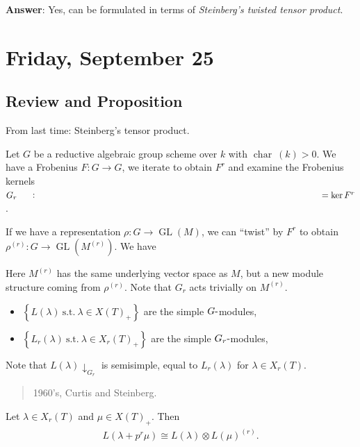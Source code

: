 \textbf{Answer}: Yes, can be formulated in terms of \emph{Steinberg's
twisted tensor product}.

\hypertarget{friday-september-25}{%
\section{Friday, September 25}\label{friday-september-25}}

\hypertarget{review-and-proposition}{%
\subsection{Review and Proposition}\label{review-and-proposition}}

From last time: Steinberg's tensor product.

Let \(G\) be a reductive algebraic group scheme over \(k\) with
\(\operatorname{char}~(k) > 0\). We have a Frobenius \(F:G\to G\), we
iterate to obtain \(F^r\) and examine the Frobenius kernels
\(G_r\mathrel{\vcenter{:}}=\ker F^r\).

If we have a representation \(\rho: G\to \operatorname{GL}(M)\), we can
``twist'' by \(F^r\) to obtain
\(\rho^{(r)}: G \to \operatorname{GL}(M^{(r)})\). We have

Here \(M^{(r)}\) has the same underlying vector space as \(M\), but a
new module structure coming from \(\rho^{(r)}\). Note that \(G_r\) acts
trivially on \(M^{(r)}\).

\begin{itemize}
\tightlist
\item
  \(\left\{{L(\lambda) ~{\text{s.t.}}~\lambda \in X(T)_+}\right\}\) are
  the simple \(G{\hbox{-}}\)modules,
\item
  \(\left\{{L_r(\lambda) ~{\text{s.t.}}~\lambda \in X_r(T)_+}\right\}\)
  are the simple \(G_r{\hbox{-}}\)modules,
\end{itemize}

Note that \(L(\lambda)\downarrow_{G_r}\) is semisimple, equal to
\(L_r(\lambda)\) for \(\lambda \in X_r(T)\).

\begin{quote}
1960's, Curtis and Steinberg.
\end{quote}

\begin{proposition}[?]

\begin{proposition}[?]

Let \(\lambda \in X_r(T)\) and \(\mu \in X(T)_+\). Then
\begin{align*}   L(\lambda + p^r \mu) \cong L(\lambda) \otimes L(\mu)^{(r)} .\end{align*}

\end{proposition}

\end{proposition}

